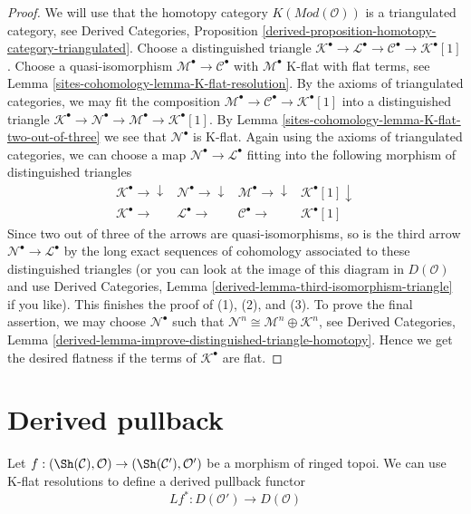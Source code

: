 \begin{proof}
We will use that the homotopy category $K(\textit{Mod}(\mathcal{O}))$
is a triangulated category, see Derived Categories, Proposition
\ref{derived-proposition-homotopy-category-triangulated}.
Choose a distinguished triangle
$\mathcal{K}^\bullet \to \mathcal{L}^\bullet \to
\mathcal{C}^\bullet \to \mathcal{K}^\bullet[1]$.
Choose a quasi-isomorphism $\mathcal{M}^\bullet \to \mathcal{C}^\bullet$ with
$\mathcal{M}^\bullet$ K-flat with flat terms, see
Lemma \ref{sites-cohomology-lemma-K-flat-resolution}.
By the axioms of triangulated categories,
we may fit the composition
$\mathcal{M}^\bullet \to \mathcal{C}^\bullet \to \mathcal{K}^\bullet[1]$
into a distinguished triangle
$\mathcal{K}^\bullet \to \mathcal{N}^\bullet \to
\mathcal{M}^\bullet \to \mathcal{K}^\bullet[1]$.
By Lemma \ref{sites-cohomology-lemma-K-flat-two-out-of-three} we see that
$\mathcal{N}^\bullet$ is K-flat.
Again using the axioms of triangulated categories,
we can choose a map $\mathcal{N}^\bullet \to \mathcal{L}^\bullet$ fitting into
the following morphism of distinguished triangles
$$
\begin{array}{cccc}\mathcal{K}^\bullet \longrightarrow\downarrow & \mathcal{N}^\bullet \longrightarrow\downarrow & \mathcal{M}^\bullet \longrightarrow\downarrow & \mathcal{K}^\bullet[1] \downarrow \\ \mathcal{K}^\bullet \longrightarrow & \mathcal{L}^\bullet \longrightarrow & \mathcal{C}^\bullet \longrightarrow & \mathcal{K}^\bullet[1]\end{array}
$$
Since two out of three of the arrows are quasi-isomorphisms, so is
the third arrow $\mathcal{N}^\bullet \to \mathcal{L}^\bullet$
by the long exact sequences
of cohomology associated to these distinguished triangles
(or you can look at the image of this diagram in $D(\mathcal{O})$ and use
Derived Categories, Lemma \ref{derived-lemma-third-isomorphism-triangle}
if you like). This finishes the proof of (1), (2), and (3).
To prove the final assertion, we may choose $\mathcal{N}^\bullet$ such that
$\mathcal{N}^n \cong \mathcal{M}^n \oplus \mathcal{K}^n$, see
Derived Categories, Lemma
\ref{derived-lemma-improve-distinguished-triangle-homotopy}.
Hence we get the desired flatness
if the terms of $\mathcal{K}^\bullet$ are flat.
\end{proof}

\section{Derived pullback}
\label{sites-cohomology-section-derived-pullback}
Let
$f : (\Sh(\mathcal{C}), \mathcal{O}) \to
(\Sh(\mathcal{C}'), \mathcal{O}')$
be a morphism of ringed topoi. We can use K-flat resolutions to define
a derived pullback functor
$$
Lf^* : D(\mathcal{O}') \to D(\mathcal{O})
$$


